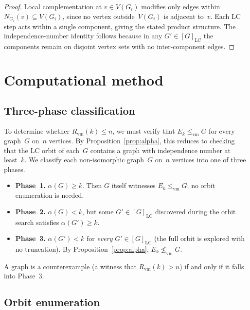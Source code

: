 \documentclass[11pt]{amsart}
\theoremstyle{definition}
\theoremstyle{remark}
\newcommand{\Rvm}{R_{\mathrm{vm}}}
\newcommand{\LC}{\mathrm{LC}}
\newcommand{\vm}{\leq_{\mathrm{vm}}}
\begin{document}
\begin{proof}
  Local complementation at $v\in V(G_i)$ modifies only edges within
  $N_{G_i}(v)\subseteq V(G_i)$, since no vertex outside~$V(G_i)$ is
  adjacent to~$v$.  Each LC step acts within a single component, giving
  the stated product structure.  The independence-number identity follows
  because in any $G'\in[G]_{\LC}$ the components remain on disjoint
  vertex sets with no inter-component edges.
\end{proof}


\section{Computational method}\label{sec:method}

\subsection{Three-phase classification}\label{subsec:phases}

To determine whether $\Rvm(k)\leq n$, we must verify that $E_k\vm G$
for every graph~$G$ on~$n$ vertices.  By
Proposition~\ref{prop:alpha}, this reduces to checking that the LC orbit
of each~$G$ contains a graph with independence number at least~$k$.  We
classify each non-isomorphic graph~$G$ on~$n$ vertices into one of three
phases.
\begin{itemize}
  \item \textbf{Phase~1.}  $\alpha(G)\geq k$.  Then $G$ itself
    witnesses $E_k\vm G$; no orbit enumeration is needed.
  \item \textbf{Phase~2.}  $\alpha(G)<k$, but some $G'\in[G]_{\LC}$
    discovered during the orbit search satisfies $\alpha(G')\geq k$.
  \item \textbf{Phase~3.}  $\alpha(G')<k$ for \emph{every}
    $G'\in[G]_{\LC}$ (the full orbit is explored with no truncation).
    By Proposition~\ref{prop:alpha}, $E_k\not\vm G$.
\end{itemize}
A graph is a counterexample (a witness that $\Rvm(k)>n$) if and only if
it falls into Phase~3.

\subsection{Orbit enumeration}\label{subsec:bfs}
\end{document}
